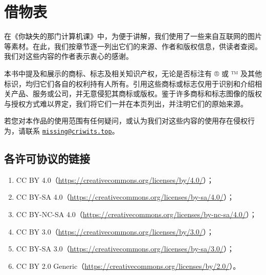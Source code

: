 \chapter{借物表}
\label{cha:attribution-of-external-content}

在《你缺失的那门计算机课》中，为便于讲解，我们使用了一些来自互联网的图片等素材。在此，我们按章节逐一列出它们的来源、作者和版权信息，供读者查阅。我们对这些内容的作者表示衷心的感谢。

本书中提及和展示的商标、标志及相关知识产权，无论是否标注有 ® 或 ™ 及其他标识，均归它们各自的权利持有人所有。引用这些商标或标志仅用于识别和介绍相关产品、服务或公司，并无意侵犯其商标或版权。鉴于许多商标和标志图像的版权与授权方式难以界定，我们将它们一并在本页列出，并注明它们的原始来源。

若您对本作品的使用范围有任何疑问，或认为我们对这些内容的使用存在侵权行为，请联系 \href{mailto:missing@criwits.top}{\texttt{missing@criwits.top}}。

\section{各许可协议的链接}

\begin{enumerate}
  \item CC BY 4.0（\url{https://creativecommons.org/licenses/by/4.0/}）；
  \item CC BY-SA 4.0（\url{https://creativecommons.org/licenses/by-sa/4.0/}）；
  \item CC BY-NC-SA 4.0（\url{https://creativecommons.org/licenses/by-nc-sa/4.0/}）；
  \item CC BY 3.0（\url{https://creativecommons.org/licenses/by/3.0/}）；
  \item CC BY-SA 3.0（\url{https://creativecommons.org/licenses/by-sa/3.0/}）；
  \item CC BY 2.0 Generic（\url{https://creativecommons.org/licenses/by/2.0/}）。
\end{enumerate}

\section{}

